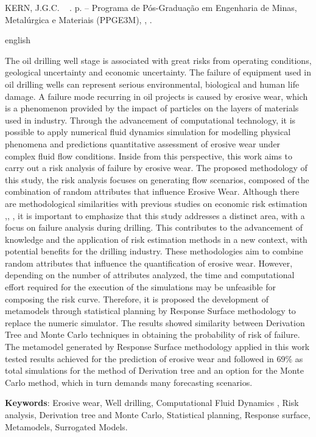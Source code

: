 \documentclass[
	12pt,				%
	openright,			%
	oneside,			%
	a4paper,			%
	english,			%
	french,				%
	spanish,			%
	brazil				%
	]{abntex2}
\begin{document}
\begin{resumo}[Abstract]
\SingleSpacing KERN, J.G.C. ~{\bfseries \rmfamily \fontsize{12}{12} \imprimirtitulo} \imprimirdata. \thelastpage p. \imprimirtipotrabalho – Programa de Pós-Graduação em Engenharia de Minas, Metalúrgica e Materiais (PPGE3M), \imprimirinstituicao, \imprimirlocal.
 \begin{otherlanguage*}{english}
 
The oil drilling well stage is associated with great risks from operating conditions, geological uncertainty
and economic uncertainty. The failure of equipment used in oil drilling wells can
represent serious environmental, biological and human life damage. A failure mode
recurring in oil projects is caused by erosive wear, which is a phenomenon
provided by the impact of particles on the layers of materials used in industry. Through the advancement of computational technology, it is possible to apply
numerical fluid dynamics simulation for modelling physical phenomena and predictions
quantitative assessment of erosive wear under complex fluid flow conditions. Inside
from this perspective, this work aims to carry out a risk analysis of failure by
erosive wear. The proposed methodology of this study, the risk analysis focuses on generating flow scenarios, composed of the combination of random attributes that influence Erosive Wear. Although there are methodological similarities with previous studies on economic risk estimation \cite{loschiavo},\cite{steagall}, \cite{santoss2}, it is important to emphasize that this study addresses a distinct area, with a focus on failure analysis during drilling. This contributes to the advancement of knowledge and the application of risk estimation methods in a new context, with potential benefits for the drilling industry. These methodologies aim to combine random attributes that influence the quantification of erosive wear. However, depending on the number of attributes analyzed, the time and computational effort required for the execution
of the simulations may be unfeasible for composing the risk curve. Therefore, it is proposed
the development of metamodels through statistical planning by Response Surface methodology to replace the numeric simulator. The results showed similarity
between Derivation Tree and Monte Carlo techniques in obtaining the probability of
risk of failure. The metamodel generated by
Response Surface methodology applied in this work tested results achieved for the
prediction of erosive wear and followed in 69\% as total simulations for the method of
Derivation tree and an option for the Monte Carlo method, which in turn
demands many forecasting scenarios.
   

   \vspace{\onelineskip}
 
   \noindent 
   \textbf{Keywords}: Erosive wear, Well drilling, Computational Fluid Dynamics , Risk analysis, Derivation tree and Monte Carlo, Statistical planning, Response surface, Metamodels, Surrogated Models.
 \end{otherlanguage*}
\end{resumo}
\end{document}
